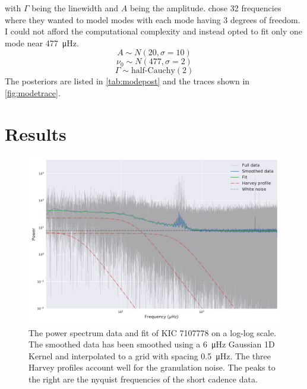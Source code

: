 \documentclass[
    aip,
    jmp,
    reprint,
    nofootinbib,
    floatfix
    ]{revtex4-1}
\begin{document}
    with $\Gamma$ being the linewidth and $A$ being the amplitude. \cite{li} chose 32 frequencies where they wanted to model modes with each mode having 3 degrees of freedom. I could not afford the computational complexity and instead opted to fit only one mode near \SI{477}{\micro Hz}. 
    $$ A \sim N(20, \sigma=10) $$
    $$ \nu_0 \sim N(477, \sigma=2) $$
    $$ \Gamma \sim \text{half-Cauchy}(2) $$
    The posteriors are listed in \autoref{tab:modepost} and the traces shown in \autoref{fig:modetrace}.

    \section{Results}

    \begin{figure}[th]
        \centering
        \includegraphics[width=\linewidth]{../figs/psd_fit}
        \caption{The power spectrum data and fit of KIC 7107778 on a log-log scale. The smoothed data has been smoothed using a \SI{6}{\micro Hz} Gaussian 1D Kernel and interpolated to a grid with spacing \SI{0.5}{\micro Hz}. The three Harvey profiles account well for the granulation noise. The peaks to the right are the nyquist frequencies of the short cadence data.}
        \label{fig:envfit}
    \end{figure}
\end{document}
